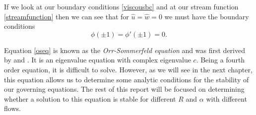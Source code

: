 If we look at our boundary conditions \eqref{viscousbc} and at our stream function \eqref{streamfunction} then we can see that for $ \hat{u} = \hat{w} = 0$ we must have the boundary conditions
\begin{equation}
    \phi(\pm 1) = \phi'(\pm 1) = 0.
    \label{osbc}
\end{equation}

Equation \eqref{oseq} is known as the \emph{Orr-Sommerfeld equation} and was first derived by \citet{zbMATH02645274} and \citet{sommerfeld1909beitrag}. It is an eigenvalue equation with complex eigenvalue $ c$. Being a fourth order equation, it is difficult to solve. However, as we will see in the next chapter, this equation allows us to determine some analytic conditions for the stability of our governing equations. The rest of this report will be focused on determining whether a solution to this equation is stable for different $R$ and $ \alpha $ with different flows.











